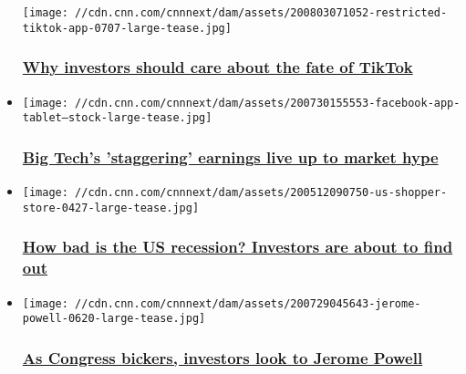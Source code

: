 \begin{itemize}
  \texttt{[image: //cdn.cnn.com/cnnnext/dam/assets/200803071052-restricted-tiktok-app-0707-large-tease.jpg]}

  \hypertarget{why-investors-should-care-about-the-fate-of-tiktok}{%
  \subsubsection{\texorpdfstring{\href{/2020/08/03/investing/premarket-stocks-trading/index.html}{Why
  investors should care about the fate of
  TikTok}}{Why investors should care about the fate of TikTok}}\label{why-investors-should-care-about-the-fate-of-tiktok}}
\item
  \href{/2020/07/31/investing/premarket-stocks-trading/index.html}{}

  \texttt{[image: //cdn.cnn.com/cnnnext/dam/assets/200730155553-facebook-app-tablet---stock-large-tease.jpg]}

  \hypertarget{big-techs-staggering-earnings-live-up-to-market-hype}{%
  \subsubsection{\texorpdfstring{\href{/2020/07/31/investing/premarket-stocks-trading/index.html}{Big
  Tech's 'staggering' earnings live up to market
  hype}}{Big Tech's 'staggering' earnings live up to market hype}}\label{big-techs-staggering-earnings-live-up-to-market-hype}}
\item
  \href{/2020/07/30/investing/premarket-stocks-trading/index.html}{}

  \texttt{[image: //cdn.cnn.com/cnnnext/dam/assets/200512090750-us-shopper-store-0427-large-tease.jpg]}

  \hypertarget{how-bad-is-the-us-recession-investors-are-about-to-find-out}{%
  \subsubsection{\texorpdfstring{\href{/2020/07/30/investing/premarket-stocks-trading/index.html}{How
  bad is the US recession? Investors are about to find
  out}}{How bad is the US recession? Investors are about to find out}}\label{how-bad-is-the-us-recession-investors-are-about-to-find-out}}
\item
  \href{/2020/07/29/investing/premarket-stocks-trading/index.html}{}

  \texttt{[image: //cdn.cnn.com/cnnnext/dam/assets/200729045643-jerome-powell-0620-large-tease.jpg]}

  \hypertarget{as-congress-bickers-investors-look-to-jerome-powell}{%
  \subsubsection{\texorpdfstring{\href{/2020/07/29/investing/premarket-stocks-trading/index.html}{As
  Congress bickers, investors look to Jerome
  Powell}}{As Congress bickers, investors look to Jerome Powell}}\label{as-congress-bickers-investors-look-to-jerome-powell}}
\end{itemize}

